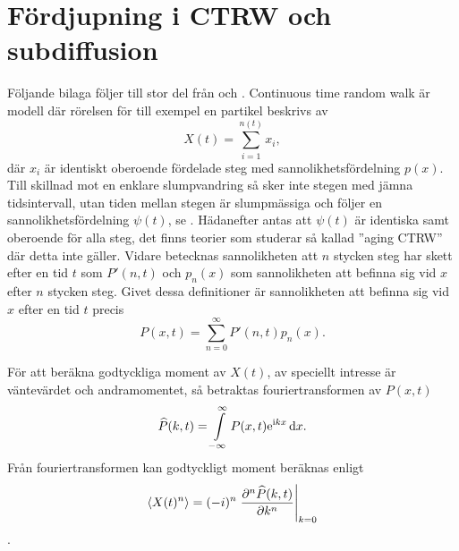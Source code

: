 \newcommand{\Pk}{\widehat{P}}
\newcommand{\Pks}{\widetilde{\widehat{P}}}
\newcommand{\pk}{\hat{p}}
\newcommand{\PPs}{\widetilde{P'}}
\newcommand{\psis}{\widetilde{\psi}}
\newcommand{\PSIs}{\widetilde{\Psi}}


\chapter{Fördjupning i CTRW och subdiffusion}


\label{app:CTRW} 
Följande bilaga följer till stor del från \cite{Chu_2003} och \cite{Vahey_2006}. Continuous time random walk är modell där rörelsen för till exempel en partikel beskrivs av 
\begin{equation}
    X(t) = \sum_{i=1}^{n(t)} x_i,
\end{equation}
där $x_i$ är identiskt oberoende fördelade steg med sannolikhetsfördelning $p(x)$. Till skillnad mot en enklare slumpvandring så sker inte stegen med jämna tidsintervall, utan tiden mellan stegen är slumpmässiga och följer en sannolikhetsfördelning $\psi (t)$, se . Hädanefter antas att $\psi(t)$ är identiska samt oberoende för alla steg, det finns teorier som studerar så kallad ''aging CTRW''\cite{Barkai_ACTRW2002} där detta inte gäller. Vidare betecknas sannolikheten att $n$ stycken steg har skett efter en tid $t$ som $P'(n,t)$ och $p_n(x)$ som sannolikheten att befinna sig vid $x$ efter $n$ stycken steg. Givet dessa definitioner är sannolikheten att befinna sig vid $x$ efter en tid $t$ precis 
\begin{equation}
\label{eq:P(x,t)}
    P(x,t) =\sum_{n=0}^{\infty} P'(n,t)p_n(x).
\end{equation}

För att beräkna godtyckliga moment av $X(t)$, av speciellt intresse är väntevärdet och andramomentet, så betraktas fouriertransformen av $P(x,t)$
\begin{equation}\label{eq:four}
\Pk (k,t) = \int_{-\infty}^{\infty} P(x,t)\ee^{\ii kx}\id{x}.
\end{equation}
Från fouriertransformen kan godtyckligt moment beräknas enligt 
\begin{equation}\label{eq:moment}
\ev{X(t)^n} = (-i)^n \eval{\frac{\pd^n \Pk (k,t)}{\pd k^n}}_{k=0}
\end{equation}. 

